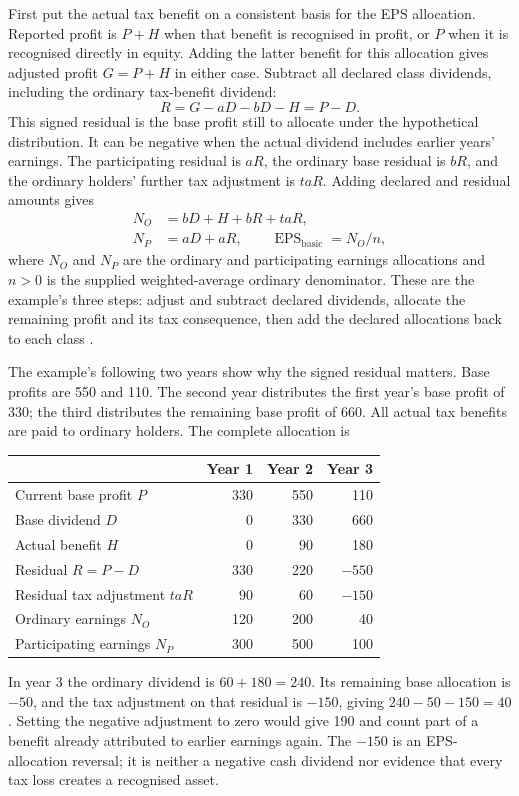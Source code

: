 First put the actual tax benefit on a consistent basis for the EPS allocation.
Reported profit is \(P+H\) when that benefit is recognised in profit, or
\(P\) when it is recognised directly in equity. Adding the latter benefit
for this allocation gives adjusted profit \(G=P+H\) in either case. Subtract
all declared class dividends, including the ordinary tax-benefit dividend:
\[
 R=G-aD-bD-H=P-D.
\]
This signed residual is the base profit still to allocate under the hypothetical
distribution. It can be negative when the actual dividend includes earlier
years' earnings. The participating residual is \(aR\), the ordinary base
residual is \(bR\), and the ordinary holders' further tax adjustment is
\(taR\). Adding declared and residual amounts gives
\[
 \begin{aligned}
 N_O&=bD+H+bR+taR,\\
 N_P&=aD+aR,\qquad \operatorname{EPS}_{\mathrm{basic}}=N_O/n,
 \end{aligned}
\]
where \(N_O\) and \(N_P\) are the ordinary and participating earnings
allocations and \(n>0\) is the supplied weighted-average ordinary denominator.
These are the example's three steps: adjust and subtract declared dividends,
allocate the remaining profit and its tax consequence, then add the declared
allocations back to each class
\citep[Steps~1--3, pp.~3--5]{ifric2017participatingtaxexample}.

The example's following two years show why the signed residual matters.
Base profits are 550 and 110. The second year distributes the first year's
base profit of 330; the third distributes the remaining base profit of 660.
All actual tax benefits are paid to ordinary holders. The complete allocation is
\begin{center}
\begin{tabular}{lrrr}
\toprule
 & Year 1 & Year 2 & Year 3\\
\midrule
Current base profit \(P\) & 330 & 550 & 110\\
Base dividend \(D\) & 0 & 330 & 660\\
Actual benefit \(H\) & 0 & 90 & 180\\
Residual \(R=P-D\) & 330 & 220 & \(-550\)\\
Residual tax adjustment \(taR\) & 90 & 60 & \(-150\)\\
Ordinary earnings \(N_O\) & 120 & 200 & 40\\
Participating earnings \(N_P\) & 300 & 500 & 100\\
\bottomrule
\end{tabular}
\end{center}
In year 3 the ordinary dividend is \(60+180=240\). Its remaining base
allocation is \(-50\), and the tax adjustment on that residual is \(-150\),
giving \(240-50-150=40\). Setting the negative adjustment to zero would give
190 and count part of a benefit already attributed to earlier earnings again.
The \(-150\) is an EPS-allocation reversal; it is neither a negative cash
dividend nor evidence that every tax loss creates a recognised asset.

